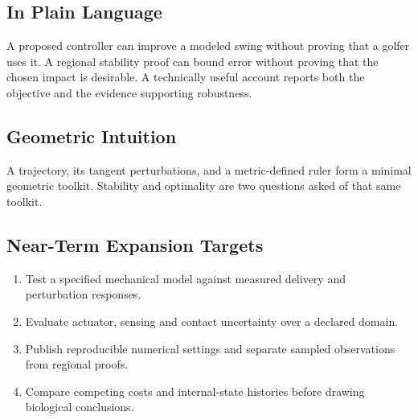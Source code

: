 \documentclass[11pt,letterpaper]{article}
\begin{document}
\subsection{In Plain Language}
A proposed controller can improve a modeled swing without proving that a golfer uses it. A regional stability proof can bound error without proving that the chosen impact is desirable. A technically useful account reports both the objective and the evidence supporting robustness.

\subsection{Geometric Intuition}
A trajectory, its tangent perturbations, and a metric-defined ruler form a minimal geometric toolkit. Stability and optimality are two questions asked of that same toolkit.

\subsection{Near-Term Expansion Targets}
\begin{enumerate}[label=\arabic*.]
\item Test a specified mechanical model against measured delivery and perturbation responses.
\item Evaluate actuator, sensing and contact uncertainty over a declared domain.
\item Publish reproducible numerical settings and separate sampled observations from regional proofs.
\item Compare competing costs and internal-state histories before drawing biological conclusions.
\end{enumerate}
\end{document}
